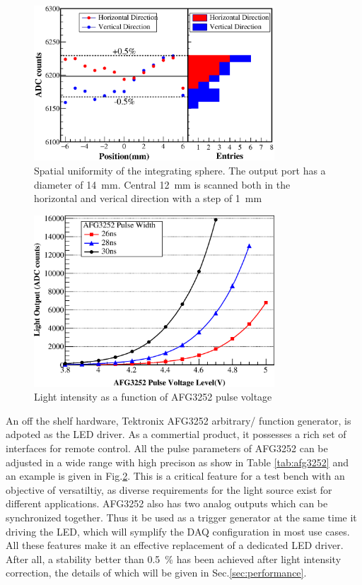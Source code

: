 \documentclass[5p, times]{elsarticle}
\begin{document}
\begin{figure}[h!]
 \centering
 \includegraphics[width=90mm]{uniformity_integratingsphere}
\caption{Spatial uniformity of the integrating sphere.
The output port has a diameter of \SI{14}{\milli\meter}.
Central \SI{12}{\milli\meter} is scanned both in the horizontal and verical direction with a step of \SI{1}{\milli\meter}}
\label{fig:uniformity_integratingsphere}
\end{figure} 
  
\begin{figure}[h!]
 \centering
 \includegraphics[width=90mm]{intesityVSvoltage}
\caption{Light intensity as a function of AFG3252 pulse voltage}
\label{fig:afg3252_intensityVSvoltage}
\end{figure} 

An off the shelf hardware, Tektronix AFG3252 arbitrary/ function generator, is adpoted as the LED driver.
As a commertial product, it possesses a rich set of interfaces for remote control.
All the pulse parameters of AFG3252 can be adjusted in a wide range with high precison as show in Table \ref{tab:afg3252} and an example is given in Fig.\ref{fig:afg3252_intensityVSvoltage}.
This is a critical feature for a test bench with an objective of versatiltiy, as diverse requirements for the light source exist for different applications.
AFG3252 also has two analog outputs which can be synchronized together.
Thus it be used as a trigger generator at the same time it driving the LED, which will symplify the DAQ configuration in most use cases. 
All these features make it an effective replacement of a dedicated LED driver. 
After all, a stability better than \SI{0.5}{\percent} has been achieved after light intensity correction, the details of which will be given in Sec.\ref{sec:performance}.
\end{document}
